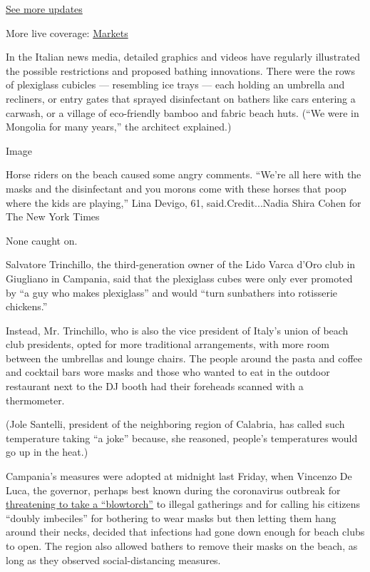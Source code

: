 \href{https://www.nytimes3xbfgragh.onion/2020/08/20/world/coronavirus-covid.html?action=click\&pgtype=Article\&state=default\&region=MAIN_CONTENT_1\&context=storylines_live_updates}{See
more updates}

More live coverage:
\href{https://www.nytimes3xbfgragh.onion/live/2020/08/20/business/stock-market-today-coronavirus?action=click\&pgtype=Article\&state=default\&region=MAIN_CONTENT_1\&context=storylines_live_updates}{Markets}

In the Italian news media, detailed graphics and videos have regularly
illustrated the possible restrictions and proposed bathing innovations.
There were the rows of plexiglass cubicles --- resembling ice trays ---
each holding an umbrella and recliners, or entry gates that sprayed
disinfectant on bathers like cars entering a carwash, or a village of
eco-friendly bamboo and fabric beach huts. (``We were in Mongolia for
many years,'' the architect explained.)

Image

Horse riders on the beach caused some angry comments. ``We're all here
with the masks and the disinfectant and you morons come with these
horses that poop where the kids are playing,'' Lina Devigo, 61,
said.Credit...Nadia Shira Cohen for The New York Times

None caught on.

Salvatore Trinchillo, the third-generation owner of the Lido Varca d'Oro
club in Giugliano in Campania, said that the plexiglass cubes were only
ever promoted by ``a guy who makes plexiglass'' and would ``turn
sunbathers into rotisserie chickens.''

Instead, Mr. Trinchillo, who is also the vice president of Italy's union
of beach club presidents, opted for more traditional arrangements, with
more room between the umbrellas and lounge chairs. The people around the
pasta and coffee and cocktail bars wore masks and those who wanted to
eat in the outdoor restaurant next to the DJ booth had their foreheads
scanned with a thermometer.

(Jole Santelli, president of the neighboring region of Calabria, has
called such temperature taking ``a joke'' because, she reasoned,
people's temperatures would go up in the heat.)

Campania's measures were adopted at midnight last Friday, when Vincenzo
De Luca, the governor, perhaps best known during the coronavirus
outbreak for
\href{https://www.nytimes3xbfgragh.onion/2020/04/26/world/europe/italy-mayors-coronavirus.html?searchResultPosition=10}{threatening
to take a ``blowtorch''} to illegal gatherings and for calling his
citizens ``doubly imbeciles'' for bothering to wear masks but then
letting them hang around their necks, decided that infections had gone
down enough for beach clubs to open. The region also allowed bathers to
remove their masks on the beach, as long as they observed
social-distancing measures.

